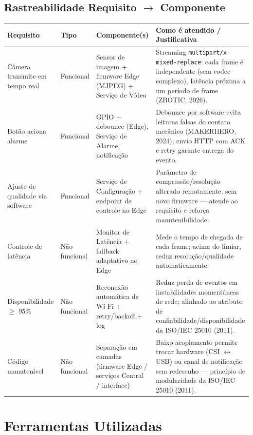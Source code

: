 \documentclass[12pt,a4paper]{article}
\begin{document}
\subsection{Rastreabilidade Requisito $\rightarrow$ Componente}

\begingroup
\small
\begin{tabularx}{\textwidth}{p{2.6cm} p{1.5cm} p{3.3cm} X}
\toprule
\textbf{Requisito} & \textbf{Tipo} & \textbf{Componente(s)} & \textbf{Como é atendido / Justificativa} \\
\midrule
Câmera transmite em tempo real & Funcional & Sensor de imagem + firmware Edge (MJPEG) + Serviço de Vídeo & Streaming \texttt{multipart/x-mixed-replace}: cada frame é independente (sem codec complexo), latência próxima a um período de frame (ZBOTIC, 2026). \\
\addlinespace
Botão aciona alarme & Funcional & GPIO + debounce (Edge), Serviço de Alarme, notificação & Debounce por software evita leituras falsas do contato mecânico (MAKERHERO, 2024); envio HTTP com ACK e retry garante entrega do evento. \\
\addlinespace
Ajuste de qualidade via software & Funcional & Serviço de Configuração + endpoint de controle no Edge & Parâmetro de compressão/resolução alterado remotamente, sem novo firmware — atende ao requisito e reforça manutenibilidade. \\
\addlinespace
Controle de latência & Não funcional & Monitor de Latência + fallback adaptativo no Edge & Mede o tempo de chegada de cada frame; acima do limiar, reduz resolução/qualidade automaticamente. \\
\addlinespace
Disponibilidade $\geq$ 95\% & Não funcional & Reconexão automática de Wi-Fi + retry/backoff + log & Reduz perda de eventos em instabilidades momentâneas de rede; alinhado ao atributo de confiabilidade/disponibilidade da ISO/IEC 25010 (2011). \\
\addlinespace
Código manutenível & Não funcional & Separação em camadas (firmware Edge / serviços Central / interface) & Baixo acoplamento permite trocar hardware (CSI $\leftrightarrow$ USB) ou canal de notificação sem redesenho — princípio de modularidade da ISO/IEC 25010 (2011). \\
\bottomrule
\end{tabularx}
\endgroup

\section{Ferramentas Utilizadas}
\end{document}
